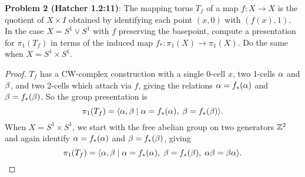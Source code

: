 \documentclass{amsart}
\begin{document}
\newpage
\textbf{Problem 2 (Hatcher 1.2:11)}: The mapping torus $T_f$ of a map $f:X\to X$ is the quotient of $X\times I$ obtained by identifying each point $(x,0)$ with $(f(x),1)$. In the case $X=S^1\vee S^1$ with $f$ preserving the basepoint, compute a presentation for $\pi_1(T_f)$ in terms of the induced map $f_*:\pi_1(X)\to\pi_1(X)$. Do the same when $X=S^1\times S^1$.
\begin{proof}
	$T_f$ has a CW-complex construction with a single 0-cell $x$, two 1-cells $\alpha$ and $\beta$, and two 2-cells which attach via $f$, giving the relations $\alpha = f_*(\alpha)$ and $\beta=f_*(\beta)$. So the group presentation is 
	$$
	\pi_1(T_f) = \langle\alpha,\beta \; | \; \alpha = f_*(\alpha),\; \beta = f_*(\beta)\rangle.
	$$
	When $X=S^1\times S^1$, we start with the free abelian group on two generators $\mathbb{Z}^2$ and again identify $\alpha=f_*(\alpha)$ and $\beta=f_*(\beta)$, giving
	$$
	\pi_1(T_f) = \langle\alpha,\beta \; | \; \alpha = f_*(\alpha), \; \beta = f_*(\beta), \; \alpha\beta=\beta\alpha \rangle.
	$$
\end{proof}
\end{document}
